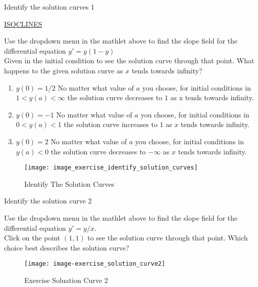 \clearpage

\begin{exercise}
  Identify the solution curves 1
\end{exercise}

\href{http://mathlets.org/mathlets/isoclines/}
{ISOCLINES}

Use the dropdown menu in the mathlet above to find the slope field for the differential equation
$\displaystyle y' = y(1-y)$\\

Given in the initial condition to see the solution curve through that point.
What happens to the given solution curve as $x$ tends towards infinity? \\
\begin{enumerate}
\item $y(0)=1/2$
  No matter what value of $a$ you choose,
  for initial conditions in $1 < y(a) < \infty$ the solution curve decreases
  to $1$ as x tends towards infinity. 
\item $y(0)=-1$
  No matter what value of $a$ you choose,
  for initial conditions in $0 < y(a) < 1$ the solution curve increases to $1$ as $x$ tends towards infinity.
\item $y(0)=2$
  No matter what value of $a$ you choose,
  for initial conditions in $y(a) < 0$ the solution curve decreases to $-\infty$ as $x$ tends towards infinity.
\end{enumerate}

\begin{figure}[ht!]
  \centering
  \texttt{[image: image\_exercise\_identify\_solution\_curves]}
  \caption{Identify The Solution Curves}
\end{figure}

\clearpage

\begin{exercise}
  Identify the solution curve 2
\end{exercise}

Use the dropdown menu in the mathlet above to find the slope field for the differential equation
$y' = y/x$. \\

Click on the point $(1,1)$ to see the solution curve through that point.
Which choice best describes the solution curve?\\

\begin{figure}[ht!]
  \centering
  \texttt{[image: image-exercise\_solution\_curve2]}
  \caption{Exercise Soluation Curve 2}
\end{figure}

